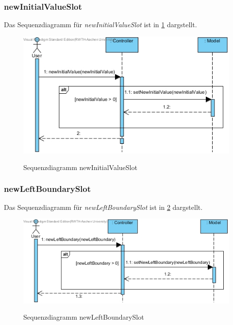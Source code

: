 \subsubsection*{newInitialValueSlot}

Das Sequenzdiagramm für \emph{newInitialValueSlot} ist in \ref{Sequenzdiagramm newInitialValueSlot} dargstellt.

\begin{figure}[H]
	\centering
	\includegraphics[scale=.6]{Bilder/Controller__newInitialValueSlot().jpg}\\
	\caption{Sequenzdiagramm newInitialValueSlot}
	\label{Sequenzdiagramm newInitialValueSlot}
\end{figure}

\subsubsection*{newLeftBoundarySlot}

Das Sequenzdiagramm für \emph{newLeftBoundarySlot} ist in \ref{Sequenzdiagramm newLeftBoundarySlot} dargstellt.

\begin{figure}[H]
	\centering
	\includegraphics[scale=.6]{Bilder/Controller__newLeftBoundarySlot().jpg}\\
	\caption{Sequenzdiagramm newLeftBoundarySlot}
	\label{Sequenzdiagramm newLeftBoundarySlot}
\end{figure}

